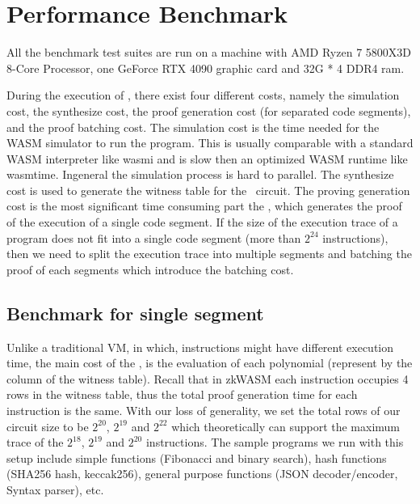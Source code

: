 \section{Performance Benchmark}
\label{chp:performance}
All the benchmark test suites are run on a machine with AMD Ryzen 7 5800X3D 8-Core Processor, one GeForce RTX 4090 graphic card and 32G * 4 DDR4 ram.

During the execution of \zkwasm, there exist four different costs, namely the simulation cost, the synthesize cost, the proof generation cost (for separated code segments), and the proof batching cost. The simulation cost is the time needed for the WASM simulator to run the program. This is usually comparable with a standard WASM interpreter like wasmi and is slow then an optimized WASM runtime like wasmtime. Ingeneral the simulation process is hard to parallel. The synthesize cost is used to generate the witness table for the \zkwasm\, circuit. The proving generation cost is the most significant time consuming part the \zkwasm, which generates the proof of the execution of a single code segment. If the size of the execution trace of a program does not fit into a single code segment (more than $2^{24}$ instructions), then we need to split the execution trace into multiple segments and batching the proof of each segments which introduce the batching cost.

\subsection{Benchmark for single segment}
Unlike a traditional VM, in which, instructions might have different execution time, the main cost of the \zkwasm, is the evaluation of each polynomial (represent by the column of the witness table). Recall that in zkWASM each instruction occupies 4 rows in the witness table, thus the total proof generation time for each instruction is the same. With our loss of generality, we set the total rows of our circuit size to be $2^{20}$, $2^{19}$ and $2^{22}$ which theoretically can support the maximum trace of the $2^{18}$, $2^{19}$ and $2^{20}$ instructions. The sample programs we run with this setup include simple functions (Fibonacci and binary search), hash functions (SHA256 hash, keccak256), general purpose functions (JSON decoder/encoder, Syntax parser), etc.  


